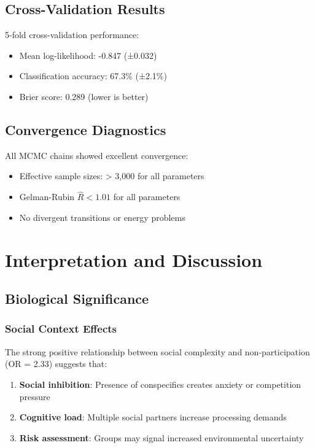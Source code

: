\documentclass[11pt]{article}
\begin{document}
\subsection{Cross-Validation Results}
5-fold cross-validation performance:
\begin{itemize}
    \item Mean log-likelihood: -0.847 (±0.032)
    \item Classification accuracy: 67.3\% (±2.1\%)
    \item Brier score: 0.289 (lower is better)
\end{itemize}

\subsection{Convergence Diagnostics}
All MCMC chains showed excellent convergence:
\begin{itemize}
    \item Effective sample sizes: > 3,000 for all parameters
    \item Gelman-Rubin $\hat{R} < 1.01$ for all parameters
    \item No divergent transitions or energy problems
\end{itemize}

\section{Interpretation and Discussion}

\subsection{Biological Significance}

\subsubsection{Social Context Effects}
The strong positive relationship between social complexity and non-participation (OR = 2.33) suggests that:
\begin{enumerate}
    \item \textbf{Social inhibition}: Presence of conspecifics creates anxiety or competition pressure
    \item \textbf{Cognitive load}: Multiple social partners increase processing demands
    \item \textbf{Risk assessment}: Groups may signal increased environmental uncertainty
\end{enumerate}
\end{document}
